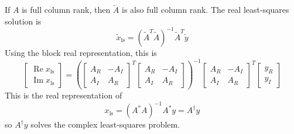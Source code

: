 If \(A\) is full column rank, then \(\tilde A\) is also full column rank. The real least-squares solution is
\[
\tilde x_{\mathrm{ls}}
=
(\tilde A^T\tilde A)^{-1}\tilde A^T\tilde y
\]
Using the block real representation, this is
\[
\begin{bmatrix}
\operatorname{Re}x_{\mathrm{ls}}\\
\operatorname{Im}x_{\mathrm{ls}}
\end{bmatrix}
=
\left(
\begin{bmatrix}
A_R&-A_I\\
A_I&A_R
\end{bmatrix}^T
\begin{bmatrix}
A_R&-A_I\\
A_I&A_R
\end{bmatrix}
\right)^{-1}
\begin{bmatrix}
A_R&-A_I\\
A_I&A_R
\end{bmatrix}^T
\begin{bmatrix}
y_R\\y_I
\end{bmatrix}
\]
This is the real representation of
\[
x_{\mathrm{ls}}=(A^*A)^{-1}A^*y=A^\dagger y
\]
so \(A^\dagger y\) solves the complex least-squares problem.
